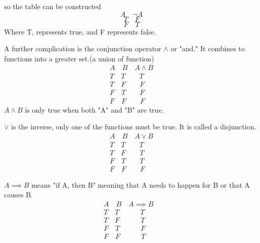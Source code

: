 so the table can be constructed
$$A \quad \neg A$$
$$T \quad F$$
$$F \quad T$$
Where T, represents true, and F represents false.

A further complication is the conjunction operator $\land $ or "and." It combines to functions into a greater set.(a union of function)
\begin{align*}
    A \quad B \quad A\land B \\
    T \quad T \quad \quad T \quad \\
    T \quad F \quad \quad F \quad \\
    F \quad T \quad \quad F \quad \\
    F \quad F \quad \quad F \quad
\end{align*}
$A \land B$ is only true when both "A" and "B" are true.

$\lor$ is the inverse, only one of the functions must be true. It is called a disjunction. 
\begin{align*}
    A \quad B \quad A\lor B \\
    T \quad T \quad \quad T \quad \\
    T \quad F \quad \quad T \quad \\
    F \quad T \quad \quad T \quad \\
    F \quad F \quad \quad F \quad
\end{align*}

$A \implies B$ means "if A, then B" meaning that A needs to happen for B or that A causes B.
\begin{align*}
    A \quad B \quad A\implies B \\
    T \quad T \quad \quad \quad T \quad \quad  \\
    T \quad F \quad \quad \quad T\quad \quad \\
    F \quad T \quad \quad \quad  F \quad \quad \\
    F \quad F \quad \quad \quad  T \quad \quad
\end{align*}
